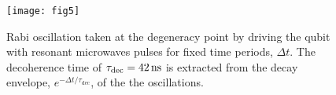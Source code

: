   \begin{figure}[h]
    \texttt{[image: fig5]}
    \caption{Rabi oscillation taken at the degeneracy point by driving the qubit with resonant
      microwaves  pulses  for  fixed  time  periods,  $  \Delta  t  $.   The  decoherence  time  of
      $   \tau_{\text{dec}}  =   42\,\text{ns}  $   is  extracted   from  the   decay  envelope,
      $ e^{-\Delta t/\tau_{\text{dec}}} $, of the the oscillations. \label{fig:rabi}}
  \end{figure}

